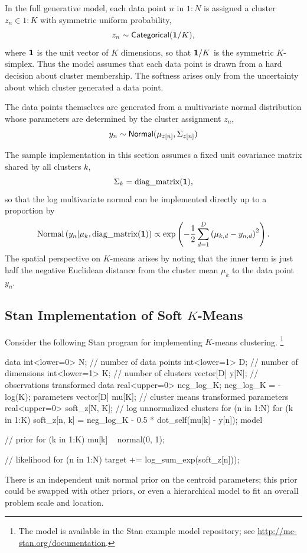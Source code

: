 In the full generative model, each data point $n$ in $1{:}N$ is assigned
a cluster $z_n \in 1{:}K$ with symmetric uniform probability,
%
\[
z_n \sim \distro{Categorical}({\bf 1}/K),
\]
where ${\bf 1}$ is the unit vector of $K$ dimensions, so that ${\bf
  1}/K$ is the symmetric $K$-simplex.  Thus the model assumes that
each data point is drawn from a hard decision about cluster
membership.  The softness arises only from the uncertainty about which
cluster generated a data point.

The data points themselves are generated from a multivariate normal
distribution whose parameters are determined by the cluster assignment
$z_n$,
\[
y_n \sim  \distro{Normal}(\mu_{z[n]},\Sigma_{z[n]})
\]

The sample implementation in this section assumes a fixed unit
covariance matrix shared by all clusters $k$,
\[
\Sigma_k = \mbox{diag\_matrix}({\bf 1}),
\]
so that the log multivariate normal can be implemented directly up to a proportion
by
\[
\mbox{Normal}\left( y_n | \mu_k, \mbox{diag\_matrix}({\bf 1}) \right)
\propto \exp \left (- \frac{1}{2} \sum_{d=1}^D \left( \mu_{k,d} - y_{n,d}
  \right)^2 \right).
\]
The spatial perspective on $K$-means arises by noting that the inner
term is just half the negative Euclidean distance from the cluster
mean $\mu_k$ to the data point $y_n$.

\subsection{Stan Implementation of Soft $K$-Means}

Consider the following Stan program for implementing $K$-means
clustering.%
%
\footnote{The model is available in the Stan example model repository;
see \url{http://mc-stan.org/documentation}.}
%
\begin{stancode}
data {
  int<lower=0> N;  // number of data points
  int<lower=1> D;  // number of dimensions
  int<lower=1> K;  // number of clusters
  vector[D] y[N];  // observations
}
transformed data {
  real<upper=0> neg_log_K;
  neg_log_K = -log(K);
}
parameters {
  vector[D] mu[K]; // cluster means
}
transformed parameters {
  real<upper=0> soft_z[N, K]; // log unnormalized clusters
  for (n in 1:N)
    for (k in 1:K)
      soft_z[n, k] = neg_log_K 
                     - 0.5 * dot_self(mu[k] - y[n]);
}
model {
  // prior
  for (k in 1:K)
    mu[k] ~ normal(0, 1);

  // likelihood
  for (n in 1:N)
    target += log_sum_exp(soft_z[n]));
}
\end{stancode}
%
There is an independent unit normal prior on the centroid parameters;
this prior could be swapped with other priors, or even a hierarchical
model to fit an overall problem scale and location.

